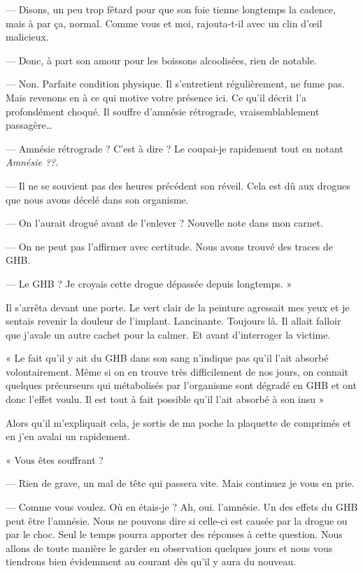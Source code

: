 — Disons, un peu trop fêtard pour que son foie tienne longtemps la cadence, mais à par ça, normal. Comme vous et moi,
rajouta-t-il avec un clin d'œil malicieux.

— Donc, à part son amour pour les boissons alcoolisées, rien de notable.

— Non. Parfaite condition physique. Il s'entretient régulièrement, ne fume pas. Mais revenons en à ce qui motive votre
présence ici. Ce qu'il décrit l'a profondément choqué. Il souffre d'amnésie rétrograde, vraisemblablement passagère…

— Amnésie rétrograde ? C'est à dire ? Le coupai-je rapidement tout en notant \emph{Amnésie ??}.

— Il ne se souvient pas des heures précédent son réveil. Cela est dû aux drogues que nous avons décelé dans son
organisme.

— On l'aurait drogué avant de l'enlever ? Nouvelle note dans mon carnet.

— On ne peut pas l'affirmer avec certitude. Nous avons trouvé des traces de GHB.

— Le GHB ? Je croyais cette drogue dépassée depuis longtemps. »

Il s'arrêta devant une porte. Le vert clair de la peinture agressait mes yeux et je sentais revenir la douleur de
l'implant. Lancinante. Toujours là. Il allait falloir que j'avale un autre cachet pour la calmer. Et avant d'interroger
la victime.

« Le fait qu'il y ait du GHB dans son sang n'indique pas qu'il l'ait absorbé volontairement. Même si on en trouve très
difficilement de nos jours, on connait quelques précurseurs qui métabolisés par l'organisme sont dégradé en GHB et ont
donc l'effet voulu. Il est tout à fait possible qu'il l'ait absorbé à son insu »

Alors qu'il m'expliquait cela, je sortis de ma poche la plaquette de comprimés et en j'en avalai un rapidement.

« Vous êtes souffrant ?

— Rien de grave, un mal de tête qui passera vite. Mais continuez je vous en prie.

— Comme vous voulez. Où en étais-je ? Ah, oui. l'amnésie. Un des effets du GHB peut être l'amnésie. Nous ne pouvons
dire si celle-ci est causée par la drogue ou par le choc. Seul le temps pourra apporter des réponses à cette question.
Nous allons de toute manière le garder en observation quelques jours et nous vous tiendrons bien évidemment au courant
dès qu'il y aura du nouveau.

